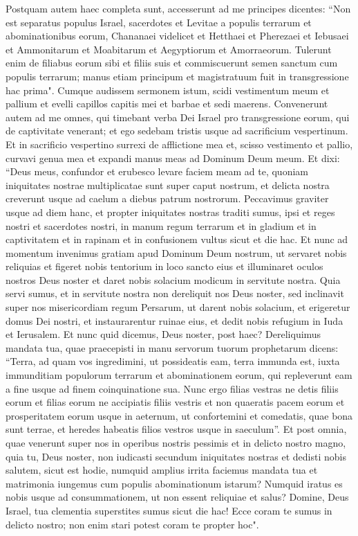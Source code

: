 \begin{biblechapter}  
\verse Postquam autem haec completa sunt, accesserunt ad me principes dicentes: “Non est separatus populus Israel, sacerdotes et Levitae a populis terrarum et abominationibus eorum, Chananaei videlicet et Hetthaei et Pherezaei et Iebusaei et Ammonitarum et Moabitarum et Aegyptiorum et Amorraeorum. 
\verse Tulerunt enim de filiabus eorum sibi et filiis suis et commiscuerunt semen sanctum cum populis terrarum; manus etiam principum et magistratuum fuit in transgressione hac prima". 
\verse Cumque audissem sermonem istum, scidi vestimentum meum et pallium et evelli capillos capitis mei et barbae et sedi maerens. 
\verse Convenerunt autem ad me omnes, qui timebant verba Dei Israel pro transgressione eorum, qui de captivitate venerant; et ego sedebam tristis usque ad sacrificium vespertinum. 
\verse Et in sacrificio vespertino surrexi de afflictione mea et, scisso vestimento et pallio, curvavi genua mea et expandi manus meas ad Dominum Deum meum. 
\verse Et dixi: “Deus meus, confundor et erubesco levare faciem meam ad te, quoniam iniquitates nostrae multiplicatae sunt super caput nostrum, et delicta nostra creverunt usque ad caelum 
\verse a diebus patrum nostrorum. Peccavimus graviter usque ad diem hanc, et propter iniquitates nostras traditi sumus, ipsi et reges nostri et sacerdotes nostri, in manum regum terrarum et in gladium et in captivitatem et in rapinam et in confusionem vultus sicut et die hac. 
\verse Et nunc ad momentum invenimus gratiam apud Dominum Deum nostrum, ut servaret nobis reliquias et figeret nobis tentorium in loco sancto eius et illuminaret oculos nostros Deus noster et daret nobis solacium modicum in servitute nostra. 
\verse Quia servi sumus, et in servitute nostra non dereliquit nos Deus noster, sed inclinavit super nos misericordiam regum Persarum, ut darent nobis solacium, et erigeretur domus Dei nostri, et instaurarentur ruinae eius, et dedit nobis refugium in Iuda et Ierusalem. 
\verse Et nunc quid dicemus, Deus noster, post haec? Dereliquimus mandata tua,  
\verse quae praecepisti in manu servorum tuorum prophetarum dicens: “Terra, ad quam vos ingredimini, ut possideatis eam, terra immunda est, iuxta immunditiam populorum terrarum et abominationem eorum, qui repleverunt eam a fine usque ad finem coinquinatione sua. 
\verse Nunc ergo filias vestras ne detis filiis eorum et filias eorum ne accipiatis filiis vestris et non quaeratis pacem eorum et prosperitatem eorum usque in aeternum, ut confortemini et comedatis, quae bona sunt terrae, et heredes habeatis filios vestros usque in saeculum”. 
\verse Et post omnia, quae venerunt super nos in operibus nostris pessimis et in delicto nostro magno, quia tu, Deus noster, non iudicasti secundum iniquitates nostras et dedisti nobis salutem, sicut est hodie, 
\verse numquid amplius irrita faciemus mandata tua et matrimonia iungemus cum populis abominationum istarum? Numquid iratus es nobis usque ad consummationem, ut non essent reliquiae et salus? 
\verse Domine, Deus Israel, tua clementia superstites sumus sicut die hac! Ecce coram te sumus in delicto nostro; non enim stari potest coram te propter hoc". 
\end{biblechapter}


